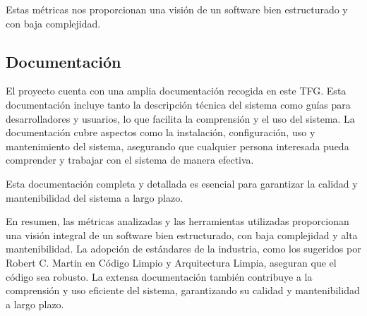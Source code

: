 Estas métricas nos proporcionan una visión de un software bien estructurado y con baja complejidad.

\subsection*{Documentación}

El proyecto cuenta con una amplia documentación recogida en este TFG.
Esta documentación incluye tanto la descripción técnica del sistema como guías para desarrolladores y usuarios, lo que
facilita la comprensión y el uso del sistema.
La documentación cubre aspectos como la instalación, configuración, uso y mantenimiento del sistema, asegurando que
cualquier persona interesada pueda comprender y trabajar con el sistema de manera efectiva.

Esta documentación completa y detallada es esencial para garantizar la calidad y mantenibilidad del sistema a largo
plazo.

En resumen, las métricas analizadas y las herramientas utilizadas proporcionan una visión integral de un software bien
estructurado, con baja complejidad y alta mantenibilidad.
La adopción de estándares de la industria, como los sugeridos por Robert C. Martin en Código Limpio y Arquitectura
Limpia, aseguran que el código sea robusto.
La extensa documentación también contribuye a la comprensión y uso eficiente del sistema, garantizando su calidad y
mantenibilidad a largo plazo.













